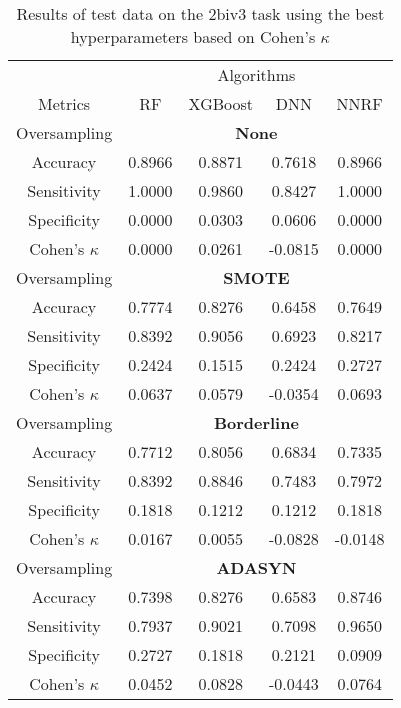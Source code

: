 \begin{table}[!htb]
\centering
\caption{Results of test data on the 2biv3 task using the best hyperparameters based on Cohen's $\kappa$}
\label{tab:2biv3_test_results}
\begin{tabular}{c | c c c c}
\hline
 & \multicolumn{4}{c}{Algorithms}\\ 
Metrics &RF & XGBoost & DNN & NNRF\\ 
\hline
Oversampling &\multicolumn{4}{|c}{\textbf{None}}\\ 
\hline
Accuracy & 0.8966 & 0.8871 & 0.7618 & 0.8966\\ 
Sensitivity & 1.0000 & 0.9860 & 0.8427 & 1.0000\\ 
Specificity & 0.0000 & 0.0303 & 0.0606 & 0.0000\\ 
Cohen's $\kappa$ & 0.0000 & 0.0261 & -0.0815 & 0.0000\\ 
\hline
Oversampling &\multicolumn{4}{|c}{\textbf{SMOTE}}\\ 
\hline
Accuracy & 0.7774 & 0.8276 & 0.6458 & 0.7649\\ 
Sensitivity & 0.8392 & 0.9056 & 0.6923 & 0.8217\\ 
Specificity & 0.2424 & 0.1515 & 0.2424 & 0.2727\\ 
Cohen's $\kappa$ & 0.0637 & 0.0579 & -0.0354 & 0.0693\\ 
\hline
Oversampling &\multicolumn{4}{|c}{\textbf{Borderline}}\\ 
\hline
Accuracy & 0.7712 & 0.8056 & 0.6834 & 0.7335\\ 
Sensitivity & 0.8392 & 0.8846 & 0.7483 & 0.7972\\ 
Specificity & 0.1818 & 0.1212 & 0.1212 & 0.1818\\ 
Cohen's $\kappa$ & 0.0167 & 0.0055 & -0.0828 & -0.0148\\ 
\hline
Oversampling &\multicolumn{4}{|c}{\textbf{ADASYN}}\\ 
\hline
Accuracy & 0.7398 & 0.8276 & 0.6583 & 0.8746\\ 
Sensitivity & 0.7937 & 0.9021 & 0.7098 & 0.9650\\ 
Specificity & 0.2727 & 0.1818 & 0.2121 & 0.0909\\ 
Cohen's $\kappa$ & 0.0452 & 0.0828 & -0.0443 & 0.0764\\ 
\hline
\end{tabular}
\end{table}

